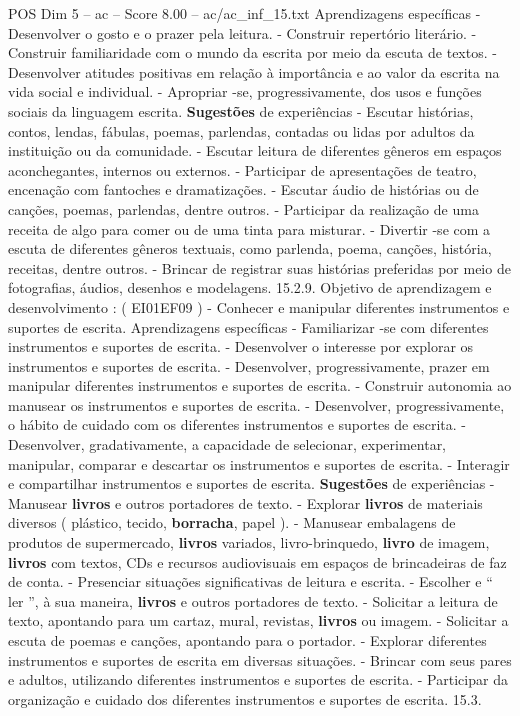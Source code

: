 \begin{textsample}{POS Dim 5 – ac – Score 8.00 – ac/ac\_inf\_15.txt}
Aprendizagens específicas - Desenvolver o gosto e o prazer pela leitura. - Construir repertório literário. - Construir familiaridade com o mundo da escrita por meio da escuta de textos. - Desenvolver atitudes positivas em relação à importância e ao valor da escrita na vida social e individual. - Apropriar -se, progressivamente, dos usos e funções sociais da linguagem escrita. \textbf{Sugestões} de experiências - Escutar histórias, contos, lendas, fábulas, poemas, parlendas, contadas ou lidas por adultos da instituição ou da comunidade. - Escutar leitura de diferentes gêneros em espaços aconchegantes, internos ou externos. - Participar de apresentações de teatro, encenação com fantoches e dramatizações. - Escutar áudio de histórias ou de canções, poemas, parlendas, dentre outros. - Participar da realização de uma receita de algo para comer ou de uma tinta para misturar. - Divertir -se com a escuta de diferentes gêneros textuais, como parlenda, poema, canções, história, receitas, dentre outros. - Brincar de registrar suas histórias preferidas por meio de fotografias, áudios, desenhos e modelagens. 15.2.9.
Objetivo de aprendizagem e desenvolvimento : ( EI01EF09 ) - Conhecer e manipular diferentes instrumentos e suportes de escrita.
Aprendizagens específicas - Familiarizar -se com diferentes instrumentos e suportes de escrita. - Desenvolver o interesse por explorar os instrumentos e suportes de escrita. - Desenvolver, progressivamente, prazer em manipular diferentes instrumentos e suportes de escrita. - Construir autonomia ao manusear os instrumentos e suportes de escrita. - Desenvolver, progressivamente, o hábito de cuidado com os diferentes instrumentos e suportes de escrita. - Desenvolver, gradativamente, a capacidade de selecionar, experimentar, manipular, comparar e descartar os instrumentos e suportes de escrita. - Interagir e compartilhar instrumentos e suportes de escrita. \textbf{Sugestões} de experiências - Manusear \textbf{livros} e outros portadores de texto. - Explorar \textbf{livros} de materiais diversos ( plástico, tecido, \textbf{borracha}, papel ). - Manusear embalagens de produtos de supermercado, \textbf{livros} variados, livro-brinquedo, \textbf{livro} de imagem, \textbf{livros} com textos, CDs e recursos audiovisuais em espaços de brincadeiras de faz de conta. - Presenciar situações significativas de leitura e escrita. - Escolher e “ ler ”, à sua maneira, \textbf{livros} e outros portadores de texto. - Solicitar a leitura de texto, apontando para um cartaz, mural, revistas, \textbf{livros} ou imagem. - Solicitar a escuta de poemas e canções, apontando para o portador. - Explorar diferentes instrumentos e suportes de escrita em diversas situações. - Brincar com seus pares e adultos, utilizando diferentes instrumentos e suportes de escrita. - Participar da organização e cuidado dos diferentes instrumentos e suportes de escrita. 15.3.

\end{textsample}
